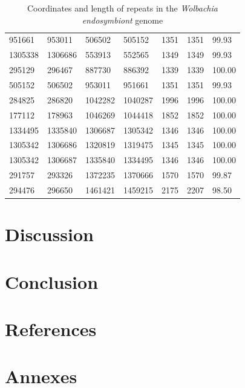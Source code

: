 \documentclass[12pt]{article}
\begin{document}
\begin{table}[h!]
{\begin{tabular}{|l|l|l|l|l|l|l|}
951661   & 953011   & 506502   & 505152   & 1351        & 1351        & 99.93          \\
1305338  & 1306686  & 553913   & 552565   & 1349        & 1349        & 99.93          \\
295129   & 296467   & 887730   & 886392   & 1339        & 1339        & 100.00         \\
505152   & 506502   & 953011   & 951661   & 1351        & 1351        & 99.93          \\
284825   & 286820   & 1042282  & 1040287  & 1996        & 1996        & 100.00         \\
177112   & 178963   & 1046269  & 1044418  & 1852        & 1852        & 100.00         \\
1334495  & 1335840  & 1306687  & 1305342  & 1346        & 1346        & 100.00         \\
1305342  & 1306686  & 1320819  & 1319475  & 1345        & 1345        & 100.00         \\
1305342  & 1306687  & 1335840  & 1334495  & 1346        & 1346        & 100.00         \\
291757   & 293326   & 1372235  & 1370666  & 1570        & 1570        & 99.87          \\
\rowcolor{red!10}
294476   & 296650   & 1461421  & 1459215  & 2175        & 2207        & 98.50         \\ \hline
\end{tabular}
\caption{Coordinates and length of repeats in the \textit{Wolbachia endosymbiont} genome}
\label{tab:repeatcoord}
}
\end{table}


\clearpage
\section{Discussion}\label{sec:disc}
\section{Conclusion} \label{sec:conc}
\clearpage

\section{References}


\newpage
\section{Annexes}
\label{sec:anx}
\setcounter{figure}{0}
\renewcommand{\thefigure}{\Alph{figure}}
 
\end{document}
